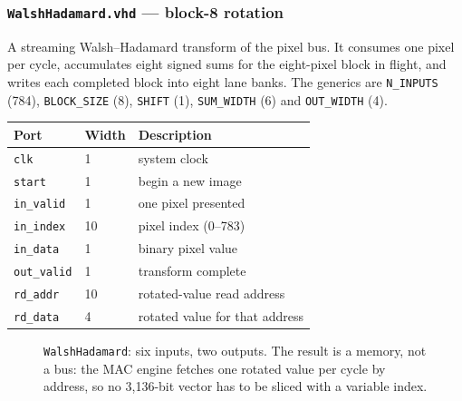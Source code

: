 \documentclass[11pt,a4paper]{article}
\begin{document}
\subsubsection{\texttt{WalshHadamard.vhd} --- block-8 rotation}
\label{sub:walsh}

A streaming Walsh--Hadamard transform of the pixel bus. It consumes one pixel per
cycle, accumulates eight signed sums for the eight-pixel block in flight, and
writes each completed block into eight lane banks. The generics are
\texttt{N\_INPUTS} (784), \texttt{BLOCK\_SIZE} (8), \texttt{SHIFT} (1),
\texttt{SUM\_WIDTH} (6) and \texttt{OUT\_WIDTH} (4).

\begin{center}
\small
\begin{tabularx}{\linewidth}{@{}llL@{}}
\toprule
\textbf{Port} & \textbf{Width} & \textbf{Description} \\
\midrule
\texttt{clk}       & 1  & system clock \\
\texttt{start}     & 1  & begin a new image \\
\texttt{in\_valid} & 1  & one pixel presented \\
\texttt{in\_index} & 10 & pixel index (0--783) \\
\texttt{in\_data}  & 1  & binary pixel value \\
\texttt{out\_valid}& 1  & transform complete \\
\texttt{rd\_addr}  & 10 & rotated-value read address \\
\texttt{rd\_data}  & 4  & rotated value for that address \\
\bottomrule
\end{tabularx}
\end{center}

\begin{figure}[H]
\centering
{}
\caption{\texttt{WalshHadamard}: six inputs, two outputs. The result is a
  memory, not a bus: the MAC engine fetches one rotated value per cycle by
  address, so no 3{,}136-bit vector has to be sliced with a variable index.}
\label{fig:walsh}
\end{figure}
\end{document}
